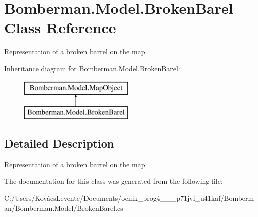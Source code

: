 \hypertarget{class_bomberman_1_1_model_1_1_broken_barel}{}\section{Bomberman.\+Model.\+Broken\+Barel Class Reference}
\label{class_bomberman_1_1_model_1_1_broken_barel}


Representation of a broken barrel on the map.  


Inheritance diagram for Bomberman.\+Model.\+Broken\+Barel\+:\begin{figure}[H]
\begin{center}
\leavevmode
\includegraphics[height=2.000000cm]{class_bomberman_1_1_model_1_1_broken_barel}
\end{center}
\end{figure}


\subsection{Detailed Description}
Representation of a broken barrel on the map. 



The documentation for this class was generated from the following file\+:\begin{DoxyCompactItemize}
\item 
C\+:/\+Users/\+Kovács\+Levente/\+Documents/oenik\+\_\+prog4\+\_\+\_\+\_\+p71jvi\+\_\+u41kaf/\+Bomberman/\+Bomberman.\+Model/Broken\+Barel.\+cs\end{DoxyCompactItemize}
